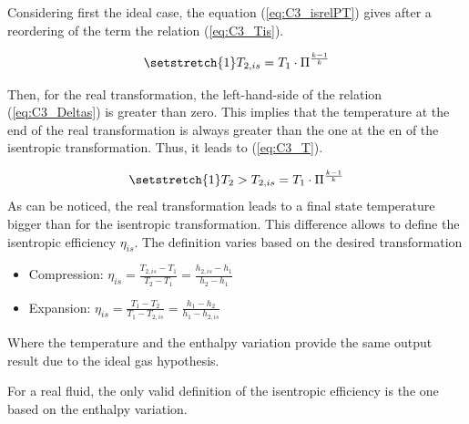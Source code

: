 Considering first the ideal case, the equation (\ref{eq:C3_isrelPT}) gives after a reordering of the term the relation (\ref{eq:C3_Tis}).

\begin{equation}
\setstretch{1}
T_{2,is} = T_1\cdot\Pi^\frac{k-1}{k}\label{eq:C3_Tis}
\end{equation}

Then, for the real transformation, the left-hand-side of the relation (\ref{eq:C3_Deltas}) is greater than zero. This implies that the temperature at the end of the real transformation is always greater than the one at the en of the isentropic transformation. Thus, it leads to (\ref{eq:C3_T}).

\begin{equation}
\setstretch{1}
T_{2} > T_{2,is} = T_1\cdot\Pi^\frac{k-1}{k}\label{eq:C3_T}
\end{equation}
As can be noticed, the real transformation leads to a final state temperature bigger than for the isentropic transformation. This difference allows to define the isentropic efficiency $\eta_{is}$. The definition varies based on the desired transformation
\begin{itemize}
\item Compression: $\eta_{is}=\frac{T_{2,is}-T_1}{T_2-T_1}=\frac{h_{2,is}-h_1}{h_2-h_1}$
\item Expansion: $\eta_{is}=\frac{T_1-T_{2}}{T_1-T_{2,is}}=\frac{h_1-h_{2}}{h_1-h_{2,is}}$
\end{itemize}
Where the temperature and the enthalpy variation provide the same output result due to the ideal gas hypothesis. 

For a real fluid, the only valid definition of the isentropic efficiency is the one based on the enthalpy variation. 


